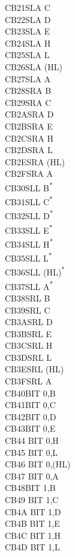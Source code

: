 \documentclass[oneside,a4paper]{book}
\begin{document}
\begin{multicols}{3}
{\begin{tabbing}
CB21\>SLA C\\
CB22\>SLA D\\
CB23\>SLA E\\
CB24\>SLA H\\
CB25\>SLA L\\
CB26\>SLA (HL)\\
CB27\>SLA A\\
CB28\>SRA B\\
CB29\>SRA C\\
CB2A\>SRA D\\
CB2B\>SRA E\\
CB2C\>SRA H\\
CB2D\>SRA L\\
CB2E\>SRA (HL)\\
CB2F\>SRA A\\
CB30\>SLL B\textsuperscript{*}\\
CB31\>SLL C\textsuperscript{*}\\
CB32\>SLL D\textsuperscript{*}\\
CB33\>SLL E\textsuperscript{*}\\
CB34\>SLL H\textsuperscript{*}\\
CB35\>SLL L\textsuperscript{*}\\
CB36\>SLL (HL)\textsuperscript{*}\\
CB37\>SLL A\textsuperscript{*}\\
CB38\>SRL B\\
CB39\>SRL C\\
CB3A\>SRL D\\
CB3B\>SRL E\\
CB3C\>SRL H\\
CB3D\>SRL L\\
CB3E\>SRL (HL)\\
CB3F\>SRL A\\
CB40\>BIT 0,B\\
CB41\>BIT 0,C\\
CB42\>BIT 0,D\\
CB43\>BIT 0,E\\
CB44\> 	BIT 0,H\\
CB45\> 	BIT 0,L\\
CB46\> 	BIT 0,(HL)\\
CB47\> 	BIT 0,A\\
CB48\>BIT 1,B\\
CB49\> 	BIT 1,C\\
CB4A\> 	BIT 1,D\\
CB4B\> 	BIT 1,E\\
CB4C\> 	BIT 1,H\\
CB4D\> 	BIT 1,L\\

\end{tabbing}}
\end{multicols}
\end{document}
